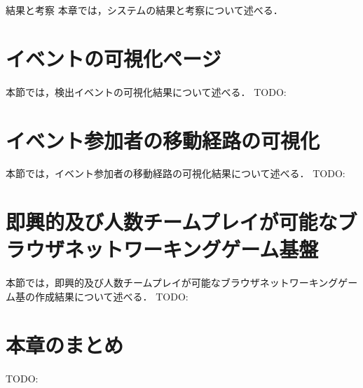 \chapterhead
{結果と考察}
{本章では，システムの結果と考察について述べる．}

\newpage
\section{イベントの可視化ページ}
本節では，検出イベントの可視化結果について述べる．
TODO:

\section{イベント参加者の移動経路の可視化}
本節では，イベント参加者の移動経路の可視化結果について述べる．
TODO:

\section{即興的及び人数チームプレイが可能なブラウザネットワーキングゲーム基盤}
本節では，即興的及び人数チームプレイが可能なブラウザネットワーキングゲーム基の作成結果について述べる．
TODO:

\newpage

\section{本章のまとめ}
TODO:

\newpage
